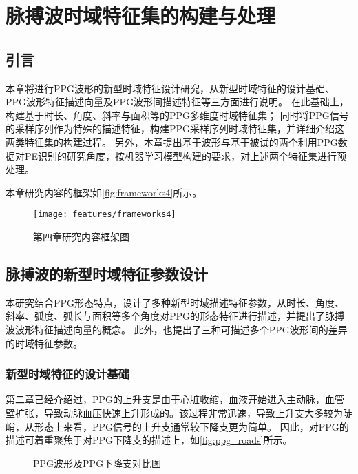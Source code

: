 \chapter{脉搏波时域特征集的构建与处理}
\section{引言}
本章将进行PPG波形的新型时域特征设计研究，从新型时域特征的设计基础、PPG波形特征描述向量及PPG波形间描述特征等三方面进行说明。
在此基础上，构建基于时长、角度、斜率与面积等的PPG多维度时域特征集；
同时将PPG信号的采样序列作为特殊的描述特征，构建PPG采样序列时域特征集，并详细介绍这两类特征集的构建过程。
另外，本章提出基于波形与基于被试的两个利用PPG数据对PE识别的研究角度，按机器学习模型构建的要求，对上述两个特征集进行预处理。

本章研究内容的框架如\autoref{fig:frameworks4}所示。

\begin{figure}[htbp]
  \centering
  \texttt{[image: features/frameworks4]}
  \caption{\label{fig:frameworks4}第四章研究内容框架图}
\end{figure}

\section{脉搏波的新型时域特征参数设计}
本研究结合PPG形态特点，设计了多种新型时域描述特征参数，从时长、角度、斜率、弧度、弧长与面积等多个角度对PPG的形态特征进行描述，并提出了脉搏波波形特征描述向量的概念。
此外，也提出了三种可描述多个PPG波形间的差异的时域特征参数。

\subsection{新型时域特征的设计基础}

第二章已经介绍过，PPG的上升支是由于心脏收缩，血液开始进入主动脉，血管壁扩张，导致动脉血压快速上升形成的。该过程非常迅速，导致上升支大多较为陡峭，从形态上来看，PPG信号的上升支通常较下降支更为简单。
因此，对PPG的描述可着重聚焦于对PPG下降支的描述上，如\autoref{fig:ppg_roads}所示。
\begin{figure}[htbp]
  \centering
  \quad
  \caption{\label{fig:ppg_roads}PPG波形及PPG下降支对比图}
\end{figure}

